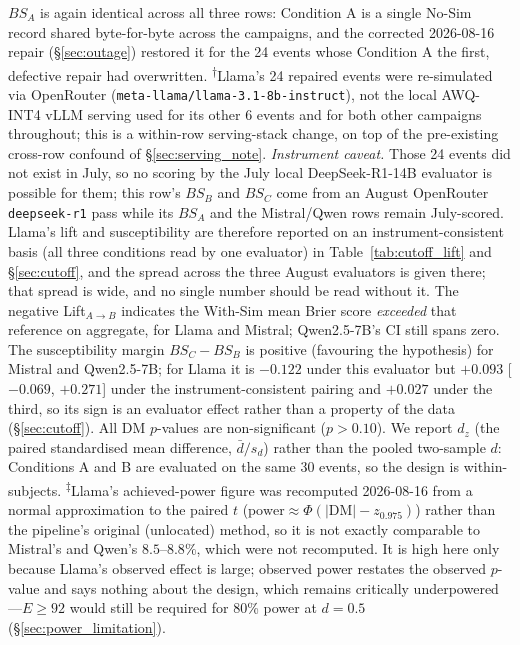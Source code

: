 \documentclass[11pt,journal,onecolumn]{IEEEtran}
\begin{document}
\begin{table}[!htbp]
\footnotesize $BS_A$ is again identical across all three rows: Condition A is a single No-Sim record shared byte-for-byte across the campaigns, and the corrected 2026-08-16 repair (\S\ref{sec:outage}) restored it for the 24 events whose Condition A the first, defective repair had overwritten. \textsuperscript{$\dagger$}Llama's 24 repaired events were re-simulated via OpenRouter (\texttt{meta-llama/llama-3.1-8b-instruct}), not the local AWQ-INT4 vLLM serving used for its other 6 events and for both other campaigns throughout; this is a within-row serving-stack change, on top of the pre-existing cross-row confound of \S\ref{sec:serving_note}. \emph{Instrument caveat.} Those 24 events did not exist in July, so no scoring by the July local DeepSeek-R1-14B evaluator is possible for them; this row's $BS_B$ and $BS_C$ come from an August OpenRouter \texttt{deepseek-r1} pass while its $BS_A$ and the Mistral/Qwen rows remain July-scored. Llama's lift and susceptibility are therefore reported on an instrument-consistent basis (all three conditions read by one evaluator) in Table~\ref{tab:cutoff_lift} and \S\ref{sec:cutoff}, and the spread across the three August evaluators is given there; that spread is wide, and no single number should be read without it. The negative Lift$_{A \to B}$ indicates the With-Sim mean Brier score \emph{exceeded} that reference on aggregate, for Llama and Mistral; Qwen2.5-7B's CI still spans zero. The susceptibility margin $BS_C - BS_B$ is positive (favouring the hypothesis) for Mistral and Qwen2.5-7B; for Llama it is $-0.122$ under this evaluator but $+0.093$ [$-0.069$, $+0.271$] under the instrument-consistent pairing and $+0.027$ under the third, so its sign is an evaluator effect rather than a property of the data (\S\ref{sec:cutoff}). All DM $p$-values are non-significant ($p > 0.10$). We report $d_z$ (the paired standardised mean difference, $\bar{d}/s_d$) rather than the pooled two-sample $d$: Conditions A and B are evaluated on the same 30 events, so the design is within-subjects. \textsuperscript{$\ddagger$}Llama's achieved-power figure was recomputed 2026-08-16 from a normal approximation to the paired $t$ ($\text{power} \approx \Phi(|\text{DM}| - z_{0.975})$) rather than the pipeline's original (unlocated) method, so it is not exactly comparable to Mistral's and Qwen's $8.5$--$8.8\%$, which were not recomputed. It is high here only because Llama's observed effect is large; observed power restates the observed $p$-value and says nothing about the design, which remains critically underpowered---$E \geq 92$ would still be required for 80\% power at $d=0.5$ (\S\ref{sec:power_limitation}).
\end{table}
\end{document}
